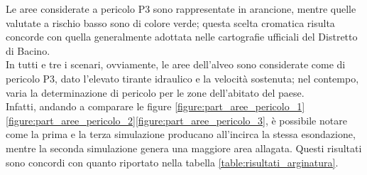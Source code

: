Le aree considerate a pericolo P3 sono rappresentate in arancione, mentre quelle valutate a rischio basso sono di colore verde; questa scelta cromatica risulta concorde con quella generalmente adottata nelle cartografie ufficiali del Distretto di Bacino.\\
In tutti e tre i scenari, ovviamente, le aree dell'alveo sono considerate come di pericolo P3, dato l'elevato tirante idraulico e la velocità sostenuta; nel contempo, varia la determinazione di pericolo per le zone dell'abitato del paese.\\
Infatti, andando a comparare le figure \eqref{figure:part_aree_pericolo_1}\eqref{figure:part_aree_pericolo_2}\eqref{figure:part_aree_pericolo_3}, è possibile notare come la prima e la terza simulazione producano all'incirca la stessa esondazione, mentre la seconda simulazione genera una maggiore area allagata. Questi risultati sono concordi con quanto riportato nella tabella \eqref{table:risultati_arginatura}.